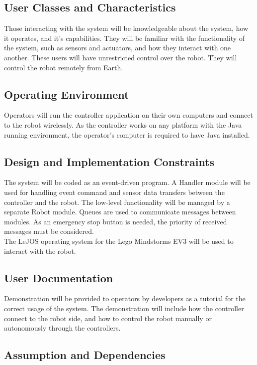 \documentclass[12pt,a4paper]{article}
\begin{document}
\subsection{User Classes and Characteristics}
    
Those interacting with the system will be knowledgeable about the system, how it operates, and it's capabilities. They will be familiar with the functionality of the system, such as sensors and actuators, and how they interact with one another. These users will have unrestricted control over the robot. They will control the robot remotely from Earth.
    
	\subsection{Operating Environment}
Operators will run the controller application on their own computers and connect to the robot wirelessly.
As the controller works on any platform with the Java running environment, the operator’s computer is required to have Java installed.
        
\subsection{Design and Implementation Constraints}
    
The system will be coded as an event-driven program.  A Handler module will be used for handling event command and sensor data transfers between the controller and the robot. The low-level functionality will be managed by a separate Robot module. Queues are used to communicate messages between modules. As an emergency stop button is needed, the priority of received messages must be considered.\\
The LeJOS operating system for the Lego Mindstorms EV3 will be used to interact with the robot.

	\subsection{User Documentation}
    
    	Demonstration will be provided to operators by developers as a tutorial for the correct usage of the system.  The demonstration will include how the controller connect to the robot side, and how to control the robot manually or autonomously through the controllers. 
        
	\subsection{Assumption and Dependencies}
    
\end{document}
